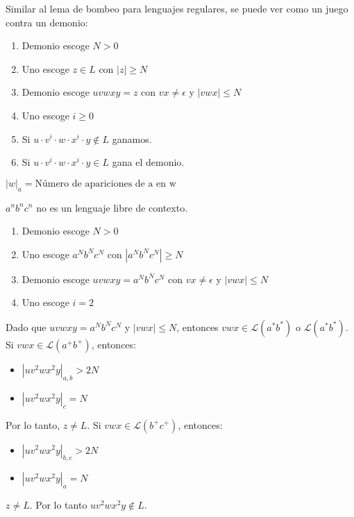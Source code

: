 \documentclass[a4paper,twoside,master.tex]{article}
\begin{document}
Similar al lema de bombeo para lenguajes regulares, se puede ver como un juego contra un demonio:
\begin{enumerate}
    \item Demonio escoge $N > 0$
    \item Uno escoge $z\in L$ con $|z| \ge N$
    \item Demonio escoge $u v w x y = z$ con $vx \neq \epsilon$ y $|vwx| \le N$
    \item Uno escoge $i \ge 0$
    \item Si $u \cdot v^i \cdot w \cdot x^i \cdot y \notin L$ ganamos.
    \item Si $u \cdot v^i \cdot w \cdot x^i \cdot y \in L$ gana el demonio.
\end{enumerate}

\begin{notacion}
    $|w|_{a} = \text{Número de apariciones de a en w}$
\end{notacion}

\begin{ej}
    $a^n b^n c^n$ no es un lenguaje libre de contexto.
    \begin{enumerate}
        \item Demonio escoge $N > 0$
        \item Uno escoge $a^N b^N c^N$ con $|a^N b^N c^N| \ge N$
        \item Demonio escoge $uvwxy = a^N b^N c^N$ con $vx \neq \epsilon$ y $|vwx| \le N$
        \item Uno escoge $i = 2$
    \end{enumerate}
    Dado que $uvwxy = a^Nb^Nc^N$ y $|vwx| \le N$, entonces $vwx \in \mathcal{L}(a^*b^*)$ o $\mathcal{L}(a^*b^*)$. Si $vwx \in \mathcal{L}(a^+b^+)$, entonces:
    \begin{itemize}
        \item $|uv^2wx^2y|_{a,b} > 2N$
        \item $|uv^2wx^2y|_{c} = N$
    \end{itemize}
    Por lo tanto, $z \neq L$. Si $vwx \in \mathcal{L}(b^+c^+)$, entonces:
    \begin{itemize}
        \item $|uv^2wx^2y|_{b,c} > 2N$
        \item $|uv^2wx^2y|_{a} = N$
    \end{itemize}
    $z \neq L$. Por lo tanto $uv^2wx^2y \notin L$.
\end{ej}
\end{document}
